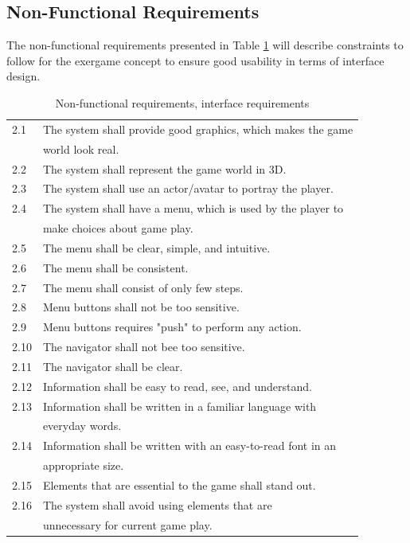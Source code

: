 \subsection{Non-Functional Requirements}
The non-functional requirements presented in Table \ref{tab:nfunc} will describe constraints to follow for the exergame concept to ensure good usability in terms of interface design.

\begin{table} [H]
\centering
\begin{tabular}{|l|l|} 
\hline
2.1 & The system shall provide good graphics, which makes the game \\ & world look real. \\ \hline
2.2 & The system shall represent the game world in 3D.\\ \hline
2.3 & The system shall use an actor/avatar to portray the player.\\ \hline
2.4 & The system shall have a menu, which is used by the player to \\ & make choices about game play.\\ \hline
2.5 & The menu shall be clear, simple, and intuitive.\\ \hline
2.6 & The menu shall be consistent. \\ \hline
2.7 & The menu shall consist of only few steps.\\ \hline
2.8 & Menu buttons shall not be too sensitive.\\ \hline
2.9 & Menu buttons requires "push" to perform any action.\\ \hline
2.10 & The navigator shall not bee too sensitive. \\ \hline
2.11 & The navigator shall be clear.\\ \hline
2.12 & Information shall be easy to read, see, and understand.\\ \hline
2.13 & Information shall be written in a familiar language with \\ & everyday words.  \\ \hline
2.14 & Information shall be written with an easy-to-read font in an \\ & appropriate size. \\ \hline
2.15 & Elements that are essential to the game shall stand out.\\ \hline
2.16 & The system shall avoid using elements that are \\ & unnecessary for current game play.\\ \hline
\end{tabular}
\caption[Non-functional requirements]{Non-functional requirements, interface requirements}
\label{tab:nfunc}
\end{table} 

